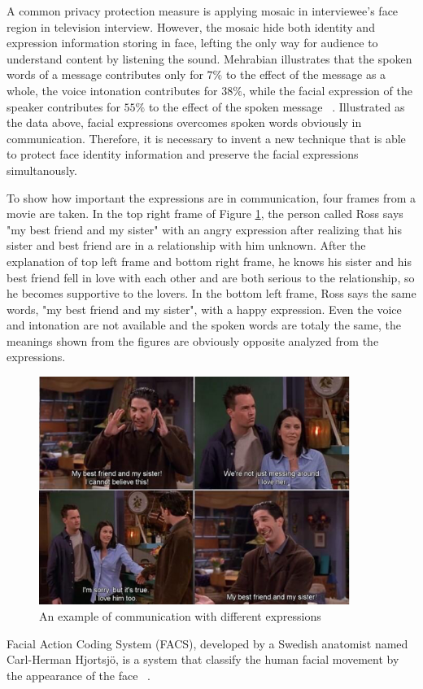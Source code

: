 \par
A common privacy protection measure is applying mosaic in interviewee's face region in television interview. 
However, the mosaic hide both identity and expression information storing in face, lefting the only way for audience to understand content by listening the sound. Mehrabian illustrates that the spoken words of a message contributes only for $7\%$ to the effect of the message as a whole, the voice intonation contributes for $38\%$, while the facial expression of the speaker contributes for $55\%$ to the effect of the spoken message ~\cite{Meh68}. Illustrated as the data above, facial expressions overcomes spoken words obviously in communication. Therefore, it is necessary to invent a new technique that is able to protect face identity information and preserve the facial expressions simultanously. 

\par
To show how important the expressions are in communication, four frames from a movie are taken. In the top right frame of Figure \ref{expression}, the person called Ross says "my best friend and my sister" with an angry expression after realizing that his sister and best friend are in a relationship with him unknown. After the explanation of top left frame and bottom right frame, he knows his sister and his best friend fell in love with each other and are both serious to the relationship, so he becomes supportive to the lovers. In the bottom left frame, Ross says the same words, "my best friend and my sister", with a happy expression. Even the voice and intonation are not available and the spoken words are totaly the same, the meanings shown from the figures are obviously opposite analyzed from the expressions. 
\begin{figure}
  \centering
  \includegraphics[width=0.9\textwidth]{figure/sisFri.png} 
  \caption{An example of communication with different expressions}
  \label{expression}
\end{figure}

Facial Action Coding System (FACS), developed by a Swedish anatomist named Carl-Herman Hjortsjö, is a system that classify the human facial movement by the appearance of the face ~\cite{facs70}. 


\par

\par